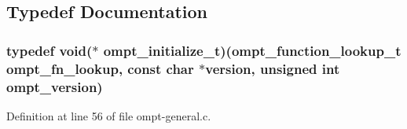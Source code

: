 \subsection{Typedef Documentation}
\hypertarget{ompt-general_8c_a47a896f6788d17f33e959156e0e4ffc0}{
\subsubsection[{ompt\-\_\-initialize\-\_\-t}]{\setlength{\rightskip}{0pt plus 5cm}typedef {\bf void}($\ast$ ompt\-\_\-initialize\-\_\-t)(ompt\-\_\-function\-\_\-lookup\-\_\-t {\bf ompt\-\_\-fn\-\_\-lookup}, const char $\ast$version, unsigned {\bf int} ompt\-\_\-version)}}\label{ompt-general_8c_a47a896f6788d17f33e959156e0e4ffc0}


Definition at line 56 of file ompt-\/general.\-c.



